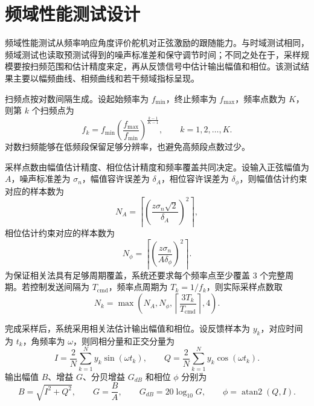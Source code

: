 \section{频域性能测试设计}

频域性能测试从频率响应角度评价舵机对正弦激励的跟随能力。与时域测试相同，频域测试也读取预测试得到的噪声标准差和保守调节时间；不同之处在于，采样规模要按扫频范围和估计精度来定，再从反馈信号中估计输出幅值和相位。该测试结果主要以幅频曲线、相频曲线和若干频域指标呈现。

扫频点按对数间隔生成。设起始频率为 $f_{\min}$，终止频率为 $f_{\max}$，频率点数为 $K$，则第 $k$ 个扫频点为
\begin{equation}
  f_k=f_{\min}\left(\frac{f_{\max}}{f_{\min}}\right)^{\frac{k-1}{K-1}},\qquad k=1,2,\ldots,K.
\end{equation}
对数扫频能够在低频段保留足够分辨率，也避免高频段点数过少。

采样点数由幅值估计精度、相位估计精度和频率覆盖共同决定。设输入正弦幅值为 $A$，噪声标准差为 $\sigma_n$，幅值容许误差为 $\delta_A$，相位容许误差为 $\delta_\phi$，则幅值估计约束对应的样本数为
\begin{equation}
  N_A=\left\lceil \left(\frac{z\sigma_n\sqrt{2}}{\delta_A}\right)^2\right\rceil,
\end{equation}
相位估计约束对应的样本数为
\begin{equation}
  N_{\phi}=\left\lceil \left(\frac{z\sigma_n}{A\delta_{\phi}}\right)^2\right\rceil.
\end{equation}
为保证相关法具有足够周期覆盖，系统还要求每个频率点至少覆盖 3 个完整周期。若控制发送间隔为 $T_{\mathrm{cmd}}$，频率点周期为 $T_k=1/f_k$，则实际采样点数取
\begin{equation}
  N_k=\max\left(N_A,N_{\phi},\left\lceil\frac{3T_k}{T_{\mathrm{cmd}}}\right\rceil,4\right).
\end{equation}

完成采样后，系统采用相关法估计输出幅值和相位。设反馈样本为 $y_k$，对应时间为 $t_k$，角频率为 $\omega$，则同相分量和正交分量为
\begin{equation}
  I=\frac{2}{N}\sum_{k=1}^{N}y_k\sin(\omega t_k),\qquad
  Q=\frac{2}{N}\sum_{k=1}^{N}y_k\cos(\omega t_k).
\end{equation}
输出幅值 $B$、增益 $G$、分贝增益 $G_{dB}$ 和相位 $\phi$ 分别为
\begin{equation}
  B=\sqrt{I^2+Q^2},\qquad
  G=\frac{B}{A},\qquad
  G_{dB}=20\log_{10}G,\qquad
  \phi=\operatorname{atan2}(Q,I).
\end{equation}

